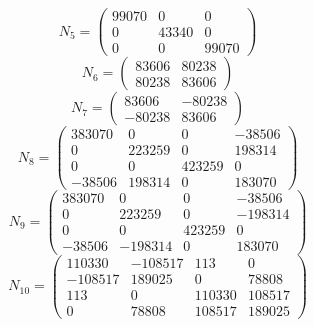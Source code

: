 \begin{equation*}
N_{5}=\begin{pmatrix}
99070 & 0 & 0 \\
0 & 43340 & 0 \\
0 & 0 & 99070
\end{pmatrix}
\end{equation*}
\begin{equation*}
N_{6}=\begin{pmatrix}
83606 & 80238 \\
80238 & 83606
\end{pmatrix}
\end{equation*}
\begin{equation*}
N_{7}=\begin{pmatrix}
83606 & -80238 \\
-80238 & 83606
\end{pmatrix}
\end{equation*}
\begin{equation*}
N_{8}=\begin{pmatrix}
383070 & 0 & 0 & -38506 \\
0 & 223259 & 0 & 198314 \\
0 & 0 & 423259 & 0 \\
-38506 & 198314 & 0 & 183070
\end{pmatrix}
\end{equation*}
\begin{equation*}
N_{9}=\begin{pmatrix}
383070 & 0 & 0 & -38506 \\
0 & 223259 & 0 & -198314 \\
0 & 0 & 423259 & 0 \\
-38506 & -198314 & 0 & 183070
\end{pmatrix}
\end{equation*}
\begin{equation*}
N_{10}=\begin{pmatrix}
110330 & -108517 & 113 & 0 \\
-108517 & 189025 & 0 & 78808 \\
113 & 0 & 110330 & 108517 \\
0 & 78808 & 108517 & 189025
\end{pmatrix}
\end{equation*}

